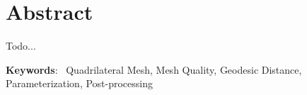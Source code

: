 \chapter{Abstract}

Todo...

\vspace{1em}
\setlength{\parindent}{0em}
\textbf{Keywords}:~ Quadrilateral Mesh, Mesh Quality, Geodesic Distance, Parameterization, Post-processing
